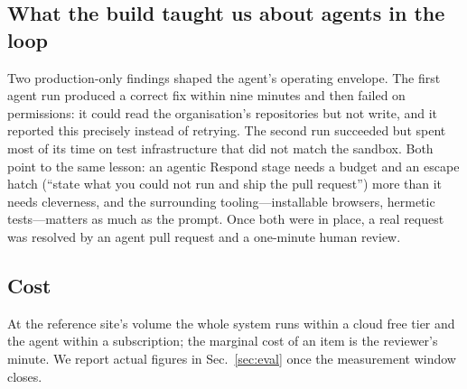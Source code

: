 \subsection{What the build taught us about agents in the loop}
Two production-only findings shaped the agent's operating envelope. The first agent run produced a correct fix within nine minutes and then failed on permissions: it could read the organisation's repositories but not write, and it reported this precisely instead of retrying. The second run succeeded but spent most of its time on test infrastructure that did not match the sandbox. Both point to the same lesson: an agentic Respond stage needs a budget and an escape hatch (``state what you could not run and ship the pull request'') more than it needs cleverness, and the surrounding tooling---installable browsers, hermetic tests---matters as much as the prompt. Once both were in place, a real request was resolved by an agent pull request and a one-minute human review.

\subsection{Cost}
At the reference site's volume the whole system runs within a cloud free tier and the agent within a subscription; the marginal cost of an item is the reviewer's minute. We report actual figures in Sec.~\ref{sec:eval} once the measurement window closes.
